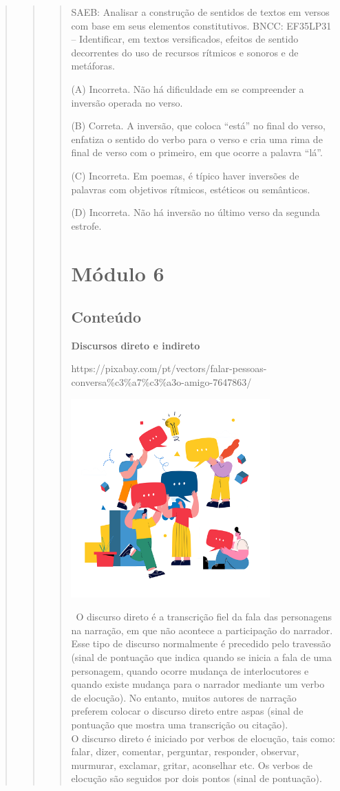 \begin{quote}
\begin{quote}
\begin{quote}
SAEB: Analisar a construção de sentidos de textos em versos com base em seus elementos constitutivos.
BNCC: EF35LP31 -- Identificar, em textos versificados, efeitos de sentido
decorrentes do uso de recursos rítmicos e sonoros e de metáforas.

(A) Incorreta. Não há dificuldade em se compreender a inversão operada no verso.

(B) Correta. A inversão, que coloca ``está'' no final do verso, enfatiza o sentido do verbo para o verso e cria uma rima de final de verso com o primeiro, em que ocorre a palavra ``lá''.

(C) Incorreta. Em poemas, é típico haver inversões de palavras com objetivos rítmicos, estéticos ou semânticos.

(D) Incorreta. Não há inversão no último verso da segunda estrofe.

\section{Módulo 6}\label{muxf3dulo-6}

\subsection{Conteúdo}\label{conteuxfado-5}

\textbf{Discursos direto e indireto}

https://pixabay.com/pt/vectors/falar-pessoas-conversa\%c3\%a7\%c3\%a3o-amigo-7647863/

\includegraphics[width=3.01042in,height=3.01042in]{media/image18.png}

~O discurso direto é a transcrição fiel da fala das personagens na
narração, em que não acontece a participação do narrador. Esse tipo de
discurso normalmente é precedido pelo travessão (sinal de pontuação que
indica quando se inicia a fala de uma personagem, quando ocorre mudança
de interlocutores e quando existe mudança para o narrador mediante um
verbo de elocução). No entanto, muitos autores de narração preferem
colocar o discurso direto entre aspas (sinal de pontuação que mostra uma
transcrição ou citação).\\
O discurso direto é iniciado por verbos de elocução, tais como: falar,
dizer, comentar, perguntar, responder, observar, murmurar, exclamar,
gritar, aconselhar etc. Os verbos de elocução são seguidos por dois
pontos (sinal de pontuação).


\end{quote}
\end{quote}
\end{quote}
